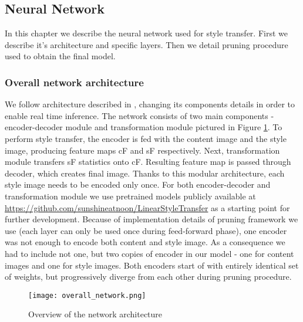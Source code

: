 \documentclass[../Main.tex]{subfiles}
\begin{document}
\subsection{Neural Network} \label{network}
    In this chapter we describe the neural network used for style transfer. 
    First we describe it's architecture and specific layers. Then we detail
    pruning procedure used to obtain the final model.
    \subsubsection{Overall network architecture} 
    We follow architecture described in \cite{Li2018}, changing its components details 
    in order to enable real time inference. The network consists of two 
    main components - encoder-decoder module and
    transformation module pictured in Figure \ref{fig:overall_network}.
    To perform style transfer, the encoder is fed with the content image
    and the style image, producing feature maps cF and sF respectively.
    Next, transformation module transfers sF statistics onto cF. Resulting 
    feature map is passed through decoder, which creates final image. 
    Thanks to this modular architecture, each style image needs to be encoded
    only once. For both encoder-decoder and
    transformation module we use pretrained models publicly available at 
    \url{https://github.com/sunshineatnoon/LinearStyleTransfer}
    as a starting point for further development. Because of implementation details
    of pruning framework we use (each layer can only be used once during 
    feed-forward phase), one encoder was not enough to encode both content and
    style image. As a consequence we had to include not one, but two copies of encoder
    in our model - one for content images and one for style images. Both encoders start of with entirely identical set of weights, but progressively diverge from each other during pruning procedure.
    
    \begin{figure}[ht!]
        \texttt{[image: overall\_network.png]}
        \caption{Overview of the network architecture \cite{Li2018}}
        \label{fig:overall_network}
    \end{figure}
    
    
\end{document}
